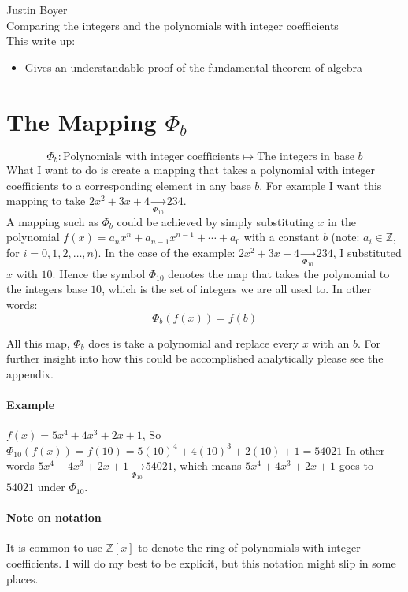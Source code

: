 \documentclass[12pt]{article}
\begin{document}



Justin Boyer\\
Comparing the integers and the polynomials with integer coefficients\\


This write up:
\begin{itemize}
\item Gives an understandable proof of the fundamental theorem of algebra
\end{itemize}

\section*{The Mapping $\Phi_b$}
$$
\Phi_b: \text{Polynomials with integer coefficients} \mapsto \text{The integers in base }b
$$
What I want to do is create a mapping that takes a polynomial with integer coefficients to a corresponding element in any base $b$.  For example I want this mapping to take $2x^2+3x+4 \xrightarrow[\Phi_{10}]{} 234$.\\  A mapping such as $\Phi_b$ could be achieved by simply  substituting $x$ in the polynomial $f(x) = a_n x^n +a_{n-1} x^{n-1} + \cdots + a_0$ with a constant $b$ (note: $a_i \in \mathbb{Z}$, for $i=0, 1, 2, \ldots, n$).  In the case of the example: $2x^2+3x+4 \xrightarrow[\Phi_{10}]{} 234$, I substituted $x$ with $10$.  Hence the symbol $\Phi_{10}$ denotes the map that takes the polynomial to the integers base $10$, which is the set of integers we are all used to.  In other words:
$$ \Phi_b(f(x)) = f(b)$$

All this map, $\Phi_b$ does is take a polynomial and replace every $x$ with an $b$.  For further insight into how this could be accomplished analytically please see the appendix.

\paragraph*{Example}
$f(x)= 5x^4+4x^3+2x+1$, So $\Phi_{10}(f(x))= f(10) = 5(10)^4 + 4(10)^3 + 2(10) + 1 = 54021$  In other words $5x^4+4x^3+2x+1 \xrightarrow[\Phi_{10}]{} 54021$, which means $5x^4+4x^3+2x+1$ goes to $54021$ under $\Phi_{10}$.

\paragraph*{Note on notation}
It is common to use $\mathbb{Z}[x]$ to denote the ring of polynomials with integer coefficients.  I will do my best to be explicit, but this notation might slip in some places. 
\end{document}
